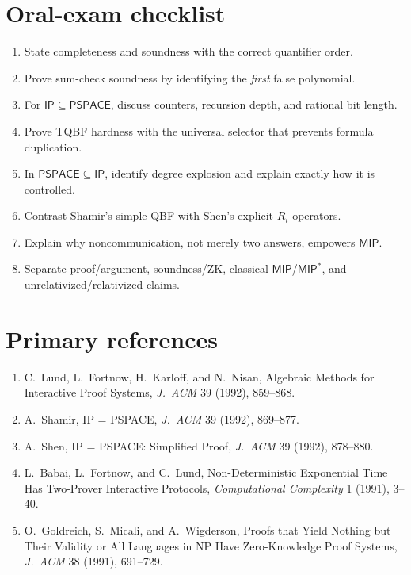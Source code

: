 \documentclass[10pt]{article}
\newcommand{\IP}{\mathsf{IP}}
\newcommand{\MIP}{\mathsf{MIP}}
\newcommand{\PSPACE}{\mathsf{PSPACE}}
\begin{document}
\section*{Oral-exam checklist}
\begin{enumerate}
\item State completeness and soundness with the correct quantifier order.
\item Prove sum-check soundness by identifying the \emph{first} false polynomial.
\item For $\IP\subseteq\PSPACE$, discuss counters, recursion depth, and rational bit length.
\item Prove TQBF hardness with the universal selector that prevents formula duplication.
\item In $\PSPACE\subseteq\IP$, identify degree explosion and explain exactly how it is controlled.
\item Contrast Shamir's simple QBF with Shen's explicit $R_i$ operators.
\item Explain why noncommunication, not merely two answers, empowers $\MIP$.
\item Separate proof/argument, soundness/ZK, classical $\MIP$/$\mathsf{MIP}^*$, and
unrelativized/relativized claims.
\end{enumerate}

\section*{Primary references}
\begin{enumerate}
\item C.~Lund, L.~Fortnow, H.~Karloff, and N.~Nisan,
Algebraic Methods for Interactive Proof Systems, \emph{J.~ACM} 39 (1992), 859--868.
\item A.~Shamir, IP = PSPACE, \emph{J.~ACM} 39 (1992), 869--877.
\item A.~Shen, IP = PSPACE: Simplified Proof, \emph{J.~ACM} 39 (1992), 878--880.
\item L.~Babai, L.~Fortnow, and C.~Lund,
Non-Deterministic Exponential Time Has Two-Prover Interactive Protocols,
\emph{Computational Complexity} 1 (1991), 3--40.
\item O.~Goldreich, S.~Micali, and A.~Wigderson,
Proofs that Yield Nothing but Their Validity or All Languages in NP Have
Zero-Knowledge Proof Systems, \emph{J.~ACM} 38 (1991), 691--729.
\end{enumerate}
\end{document}

